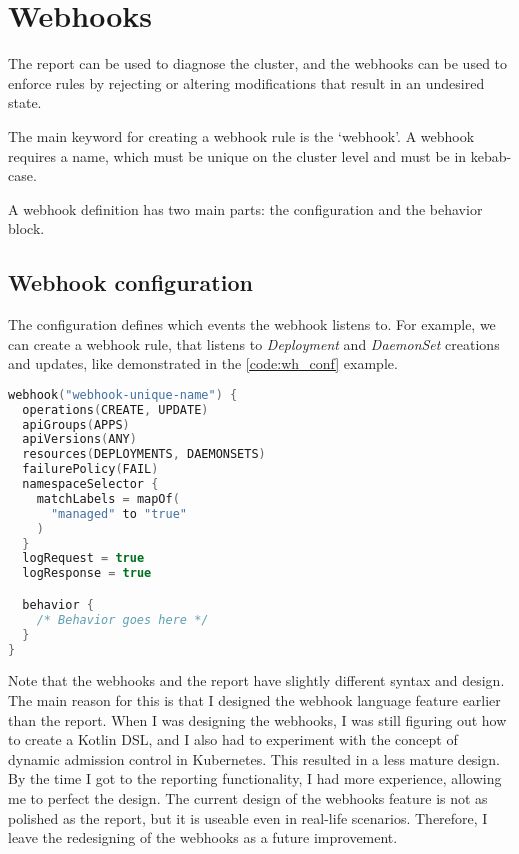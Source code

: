 \section{Webhooks}
\label{sec:webhooks}

The report can be used to diagnose the cluster, and the webhooks can be used to enforce rules by rejecting or altering modifications that result in an undesired state.

The main keyword for creating a webhook rule is the `webhook'. A webhook requires a name, which must be unique on the cluster level and must be in kebab-case.

A webhook definition has two main parts: the configuration and the behavior block.

\subsection{Webhook configuration}

The configuration defines which events the webhook listens to. For example, we can create a webhook rule, that listens to \emph{Deployment} and \emph{DaemonSet} creations and updates, like demonstrated in the \ref{code:wh_conf} example.

\begin{lstlisting}[caption={Webhook configuration},language=Kotlin,label=code:wh_conf]
webhook("webhook-unique-name") {
  operations(CREATE, UPDATE)
  apiGroups(APPS)
  apiVersions(ANY)
  resources(DEPLOYMENTS, DAEMONSETS)
  failurePolicy(FAIL)
  namespaceSelector {
    matchLabels = mapOf(
      "managed" to "true"
    )
  }
  logRequest = true
  logResponse = true

  behavior {
    /* Behavior goes here */
  }
}
\end{lstlisting}

Note that the webhooks and the report have slightly different syntax and design. The main reason for this is that I designed the webhook language feature earlier than the report. When I was designing the webhooks, I was still figuring out how to create a Kotlin DSL, and I also had to experiment with the concept of dynamic admission control in Kubernetes. This resulted in a less mature design. By the time I got to the reporting functionality, I had more experience, allowing me to perfect the design. The current design of the webhooks feature is not as polished as the report, but it is useable even in real-life scenarios. Therefore, I leave the redesigning of the webhooks as a future improvement.


